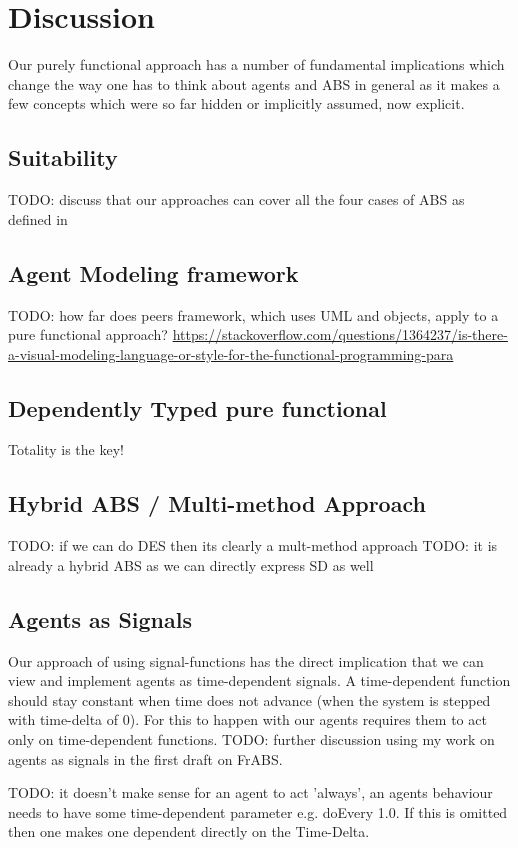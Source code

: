 \section{Discussion}
Our purely functional approach has a number of fundamental implications which change the way one has to think about agents and ABS in general as it makes a few concepts which were so far hidden or implicitly assumed, now explicit. 

\subsection{Suitability}
TODO: discuss that our approaches can cover all the four cases of ABS as defined in \cite{macal_everything_2016}

\subsection{Agent Modeling framework}
TODO: how far does peers framework, which uses UML and objects, apply to a pure functional approach?  \url{https://stackoverflow.com/questions/1364237/is-there-a-visual-modeling-language-or-style-for-the-functional-programming-para}

\subsection{Dependently Typed pure functional}
Totality is the key!

\subsection{Hybrid ABS / Multi-method Approach}
TODO: if we can do DES then its clearly a mult-method approach
TODO: it is already a hybrid ABS as we can directly express SD as well

\subsection{Agents as Signals}
Our approach of using signal-functions has the direct implication that we can view and implement agents as time-dependent signals. A time-dependent function should stay constant when time does not advance (when the system is stepped with time-delta of 0). For this to happen with our agents requires them to act only on time-dependent functions. TODO: further discussion using my work on agents as signals in the first draft on FrABS.

TODO: it doesn't make sense for an agent to act 'always', an agents behaviour needs to have some time-dependent parameter e.g. doEvery 1.0. If this is omitted then one makes one dependent directly on the Time-Delta.

